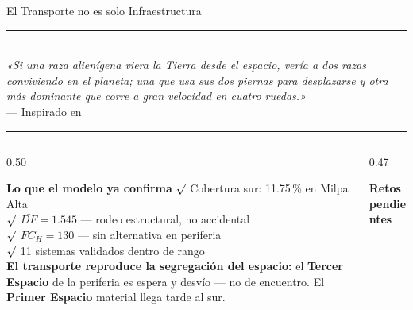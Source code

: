 \begin{frame}{El Transporte no es solo Infraestructura}
  \begin{center}
    {\color{ColorAcento}\rule{0.88\textwidth}{0.6pt}}\\[0.07cm]
    {\scriptsize\itshape
      «Si una raza alienígena viera la Tierra desde el espacio, vería a dos razas
      conviviendo en el planeta; una que usa sus dos piernas para desplazarse
      y otra más dominante que corre a gran velocidad en cuatro ruedas.»}\\[0.03cm]
    {\tiny\color{gray!60}
      --- Inspirado en \citet{adams1979hitchhiker}}\\[0.06cm]
    {\color{ColorAcento}\rule{0.60\textwidth}{0.5pt}}
  \end{center}
  \vspace{0.06cm}
  \begin{columns}[T]
    \begin{column}{0.50\textwidth}
      \begin{block}{\scriptsize\bfseries Lo que el modelo ya confirma}
        {\scriptsize
          {\color{green!60!black}$\surd$}
            Cobertura sur: 11.75\,\% en Milpa Alta\\[0.03cm]
          {\color{green!60!black}$\surd$}
            $\bar{DF}=1.545$ — rodeo estructural, no accidental\\[0.03cm]
          {\color{green!60!black}$\surd$}
            $FC_H=130$ — sin alternativa en periferia\\[0.03cm]
          {\color{green!60!black}$\surd$}
            11 sistemas validados dentro de rango\\[0.09cm]
          {\tiny\color{ColorPrincipal}
            \textbf{El transporte reproduce la segregación del espacio:}
            el \textbf{Tercer Espacio} de la periferia
            \citep{soja1996thirdspace} es espera y desvío —
            no de encuentro.
            El \textbf{Primer Espacio} material
            \citep{lefebvre2013produccion} llega tarde al sur.}}
      \end{block}
    \end{column}
    \begin{column}{0.47\textwidth}
      \begin{alertblock}{\scriptsize\bfseries Retos pendientes}

\end{alertblock}
\end{column}
\end{columns}
\end{frame}

